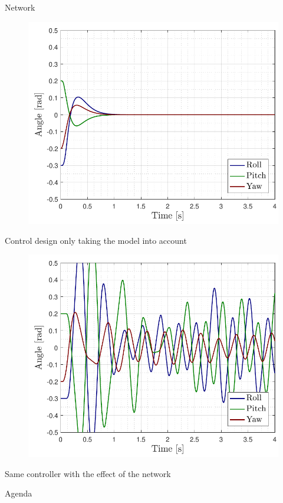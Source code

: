 \begin{frame}{Network}{}
    
    \begin{minipage}{\linewidth}
        \begin{minipage}{0.49\linewidth}
            \begin{figure}[H]
                \includegraphics[width=1\textwidth]{figures/nonetwork}
            \end{figure}
            \centering
            Control design only taking the model into account
        \end{minipage}
        \hspace{0.03\linewidth}
        \begin{minipage}{0.49\linewidth}
            \begin{figure}[H]
                \includegraphics[width=1\textwidth]{figures/network}
            \end{figure}  
            \centering
            Same controller with the effect of the network                   
        \end{minipage}
    \end{minipage}  
\end{frame}

\begin{frame}{Agenda}{}
    \tableofcontents
\end{frame}

